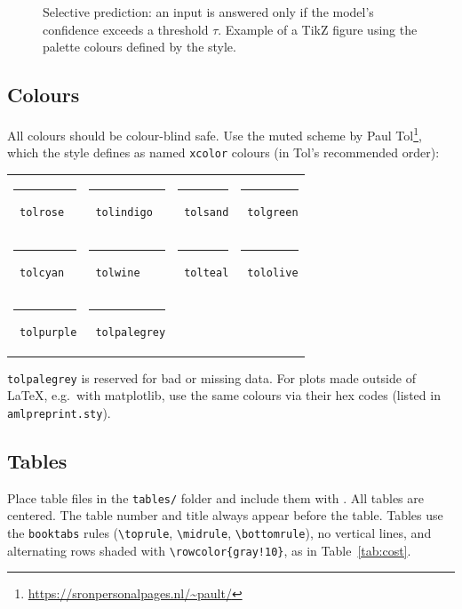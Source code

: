 \documentclass[10pt]{article} %
\begin{document}
\begin{figure}[t]
\centering

\caption{Selective prediction: an input is answered only if the model's
confidence exceeds a threshold $\tau$. Example of a TikZ figure using the
palette colours defined by the style.}
\label{fig:pipeline}
\end{figure}

\subsection{Colours}

All colours should be colour-blind safe. Use the muted scheme by
Paul Tol\footnote{\url{https://sronpersonalpages.nl/~pault/}}, which the style
defines as named \texttt{xcolor} colours (in Tol's recommended order):
\begin{center}
\newcommand{\swatch}[1]{\textcolor{#1}{\rule{1.6em}{1.6ex}}~\texttt{#1}}
\begin{tabular}{llll}
\swatch{tolrose} & \swatch{tolindigo} & \swatch{tolsand} & \swatch{tolgreen} \\
\swatch{tolcyan} & \swatch{tolwine} & \swatch{tolteal} & \swatch{tololive} \\
\swatch{tolpurple} & \swatch{tolpalegrey} & & \\
\end{tabular}
\end{center}
\texttt{tolpalegrey} is reserved for bad or missing data. For plots made
outside of \LaTeX{}, e.g.\ with matplotlib, use the same colours via their hex
codes (listed in \texttt{amlpreprint.sty}).

\subsection{Tables}

Place table files in the \texttt{tables/} folder and include them with
\verb++. All tables are centered. The table number and
title always appear before the table. Tables use the \texttt{booktabs} rules
(\verb+\toprule+, \verb+\midrule+, \verb+\bottomrule+), no vertical lines, and
alternating rows shaded with \verb+\rowcolor{gray!10}+, as in
Table~\ref{tab:cost}.

\begin{table}[htb]
\caption{Requests, input tokens, cost and latency per task category.}
\label{tab:cost}
\centering
\small

\end{table}
\end{document}
